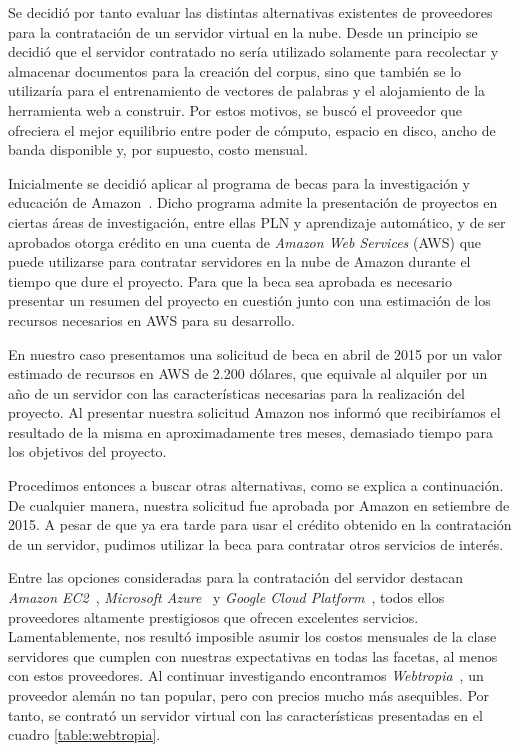 Se decidió por tanto evaluar las distintas alternativas existentes de proveedores para la contratación de
un servidor virtual en la nube. Desde un principio se decidió que el servidor contratado no sería
utilizado solamente para recolectar y almacenar documentos para la creación del corpus, sino que también
se lo utilizaría para el entrenamiento de vectores de palabras y el alojamiento de la herramienta web a
construir. Por estos motivos, se buscó el proveedor que ofreciera el mejor equilibrio entre poder de
cómputo, espacio en disco, ancho de banda disponible y, por supuesto, costo mensual.

Inicialmente se decidió aplicar al programa de becas para la investigación y educación de
Amazon~\cite{AmazonGrants}. Dicho programa admite la presentación de proyectos en ciertas áreas de
investigación, entre ellas PLN y aprendizaje automático, y de ser aprobados otorga crédito en una cuenta
de \textit{Amazon Web Services} (AWS) que puede utilizarse para contratar servidores en la nube de Amazon
durante el tiempo que dure el proyecto. Para que la beca sea aprobada es necesario presentar un resumen
del proyecto en cuestión junto con una estimación de los recursos necesarios en AWS para su desarrollo.

En nuestro caso presentamos una solicitud de beca en abril de 2015 por un valor estimado de recursos en
AWS de 2.200 dólares, que equivale al alquiler por un año de un servidor con las características
necesarias para la realización del proyecto. Al presentar nuestra solicitud Amazon nos informó que
recibiríamos el resultado de la misma en aproximadamente tres meses, demasiado tiempo para los objetivos
del proyecto.

Procedimos entonces a buscar otras alternativas, como se explica a continuación. De cualquier manera,
nuestra solicitud fue aprobada por Amazon en setiembre de 2015. A pesar de que ya era tarde para usar el
crédito obtenido en la contratación de un servidor, pudimos utilizar la beca para contratar otros
servicios de interés.

Entre las opciones consideradas para la contratación del servidor destacan \textit{Amazon
EC2}~\cite{AmazonEC2}, \textit{Microsoft Azure}~\cite{Azure} y \textit{Google Cloud
Platform}~\cite{GCP}, todos ellos proveedores altamente prestigiosos que ofrecen excelentes
servicios. Lamentablemente, nos resultó imposible asumir los costos mensuales de la clase servidores
que cumplen con nuestras expectativas en todas las facetas, al menos con estos proveedores. Al
continuar investigando encontramos \textit{Webtropia}~\cite{Webtropia}, un proveedor alemán no tan
popular, pero con precios mucho más asequibles. Por tanto, se contrató un servidor virtual con las
características presentadas en el cuadro \ref{table:webtropia}.

